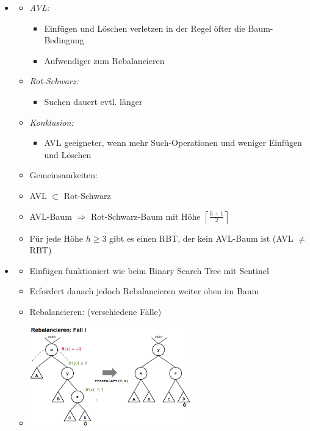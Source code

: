 \documentclass[
    12pt,
    a4paper,
    ngerman,
    color=3b,%
    marginpar=false,
    colorback=false,
    leqno,
]{tudaexercise}
\begin{document}
\begin{itemize}
        \item {}
            \begin{itemize}
                \item \textit{AVL:}
                    \begin{itemize}
                        \item Einfügen und Löschen verletzen in der Regel öfter die Baum-Bedingung
                        \item Aufwendiger zum Rebalancieren
                    \end{itemize}
                \item \textit{Rot-Schwarz:}
                    \begin{itemize}
                        \item Suchen dauert evtl. länger
                    \end{itemize}
                \item \textit{Konklusion:}
                    \begin{itemize}
                        \item AVL geeigneter, wenn mehr Such-Operationen und weniger Einfügen und Löschen
                    \end{itemize}
                \item Gemeinsamkeiten:
                    \item AVL $\subset$ Rot-Schwarz
                    \item AVL-Baum $\Rightarrow$ Rot-Schwarz-Baum mit Höhe $\left \lceil \frac{h+1}{2} \right \rceil$
                    \item Für jede Höhe $h \geq 3$ gibt es einen RBT, der kein AVL-Baum ist (AVL $\neq$ RBT)
            \end{itemize}
\clearpage
        \item {}
            \begin{itemize}
                \item Einfügen funktioniert wie beim Binary Search Tree mit Sentinel
                \item Erfordert danach jedoch Rebalancieren weiter oben im Baum
                \item Rebalancieren: (verschiedene Fälle)
                \item[]
                    \begin{minipage}{0.45\textwidth}
                        \includegraphics[width=7cm]{pictures/avlcase1.PNG}

\end{minipage}
\end{itemize}
\end{itemize}
\end{document}
